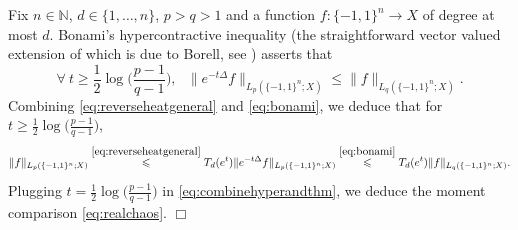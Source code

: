 \documentclass[11pt,reqno]{amsart}
\renewcommand{\leq}{\leqslant}
\renewcommand{\geq}{\geqslant}
\newcommand{\1}{\mathbf 1}
\theoremstyle{remark}
\newcommand{\N}{\mathbb N}
\begin{document}
\smallskip

Fix $n\in\N$, $d\in\{1,\ldots,n\}$, $p>q>1$ and a function $f:\{-1,1\}^n\to X$ of degree at most $d$. Bonami's hypercontractive inequality \cite{Bon70} (the straightforward vector valued extension of which is due to Borell, see \cite{Bor79}) asserts that
\begin{equation} \label{eq:bonami}
\forall \ t\geq \frac{1}{2}\log\Big(\frac{p-1}{q-1}\Big), \ \ \ \|e^{-t\Delta} f\|_{L_p(\{-1,1\}^n;X)} \leq \|f\|_{L_q(\{-1,1\}^n;X)}.
\end{equation}
Combining \eqref{eq:reverseheatgeneral} and \eqref{eq:bonami}, we deduce that for $t\geq\frac{1}{2}\log\big(\frac{p-1}{q-1}\big)$,
\begin{equation} \label{eq:combinehyperandthm}
\|f\|_{L_p(\{-1,1\}^n;X)} \stackrel{\eqref{eq:reverseheatgeneral}}{\leq} T_d(e^t) \|e^{-t\Delta}f\|_{L_p(\{-1,1\}^n;X)} \stackrel{\eqref{eq:bonami}}{\leq} T_d(e^t) \|f\|_{L_q(\{-1,1\}^n;X)}.
\end{equation}
Plugging $t=\frac{1}{2}\log\big(\frac{p-1}{q-1}\big)$ in \eqref{eq:combinehyperandthm}, we deduce the moment comparison \eqref{eq:realchaos}.
\hfill$\Box$
\end{document}
